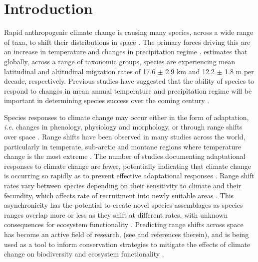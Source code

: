 \documentclass[a4paper, 11pt]{article}
\begin{document}
\section{Introduction}
Rapid anthropogenic climate change is causing many species, across a wide range of taxa, to shift their distributions in space \citep{Chen2011, Hughes2000, Parmesan2006}. The primary forces driving this are an increase in temperature and changes in precipitation regime \citep{Corlett2013, McCain2011}. \citet{Chen2011} estimates that globally, across a range of taxonomic groups, species are experiencing mean latitudinal and altitudinal migration rates of 17.6 $\pm$ 2.9 km and 12.2 $\pm$ 1.8 m per decade, respectively. Previous studies have suggested that the ability of species to respond to changes in mean annual temperature and precipitation regime will be important in determining species success over the coming century \citep{Colwell2008, Chen2011, Feeley2012}. 

Species responses to climate change may occur either in the form of adaptation, \textit{i.e.} changes in phenology, physiology and morphology, or through range shifts over space \citep{Bellard2012}. Range shifts have been observed in many studies across the world, particularly in temperate, sub-arctic and montane regions where temperature change is the most extreme \citep{Lenoir2015}. The number of studies documenting adaptational responses to climate change are fewer, potentially indicating that climate change is occurring so rapidly as to prevent effective adaptational responses \citep{Mantyka2012}. Range shift rates vary between species depending on their sensitivity to climate and their fecundity, which affects rate of recruitment into newly suitable areas \citep{MacLean2017, Travis2013}. This asynchronicity has the potential to create novel species assemblages as species ranges overlap more or less as they shift at different rates, with unknown consequences for ecosystem functionality \citep{Hobbs2009}. Predicting range shifts across space has become an active field of research, (see \citealt{Bellard2012} and references therein), and is being used as a tool to inform conservation strategies to mitigate the effects of climate change on biodiversity and ecosystem functionality \citep{Dawson2011}.
\end{document}
